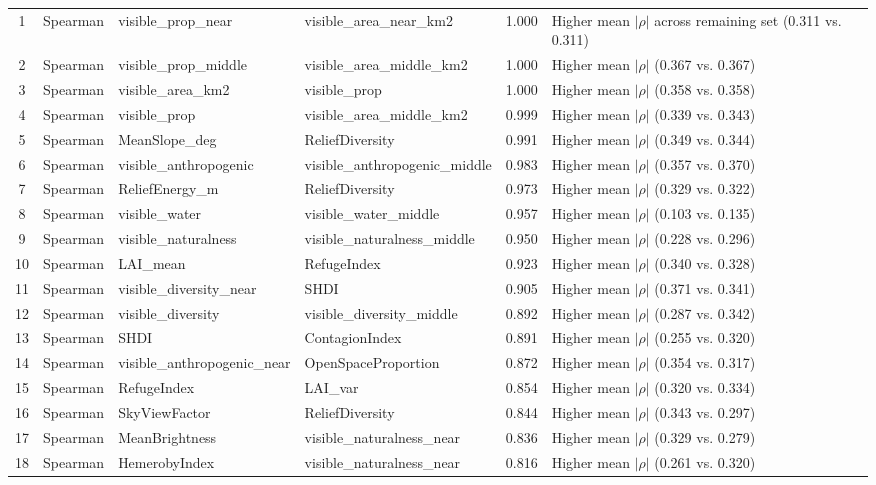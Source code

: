 \documentclass[hidelinks, 11pt]{article}
\begin{document}
\begin{longtable}{@{}cp{2.2cm}p{2.6cm}p{2.6cm}cp{6.5cm}@{}}
1  & Spearman & visible\_prop\_near & visible\_area\_near\_km2 & 1.000 & Higher mean $|\rho|$ across remaining set (0.311 vs. 0.311) \\
2  & Spearman & visible\_prop\_middle & visible\_area\_middle\_km2 & 1.000 & Higher mean $|\rho|$ (0.367 vs. 0.367) \\
3  & Spearman & visible\_area\_km2 & visible\_prop & 1.000 & Higher mean $|\rho|$ (0.358 vs. 0.358) \\
4  & Spearman & visible\_prop & visible\_area\_middle\_km2 & 0.999 & Higher mean $|\rho|$ (0.339 vs. 0.343) \\
5  & Spearman & MeanSlope\_deg & ReliefDiversity & 0.991 & Higher mean $|\rho|$ (0.349 vs. 0.344) \\
6  & Spearman & visible\_anthropogenic & visible\_anthropogenic\_middle & 0.983 & Higher mean $|\rho|$ (0.357 vs. 0.370) \\
7  & Spearman & ReliefEnergy\_m & ReliefDiversity & 0.973 & Higher mean $|\rho|$ (0.329 vs. 0.322) \\
8  & Spearman & visible\_water & visible\_water\_middle & 0.957 & Higher mean $|\rho|$ (0.103 vs. 0.135) \\
9  & Spearman & visible\_naturalness & visible\_naturalness\_middle & 0.950 & Higher mean $|\rho|$ (0.228 vs. 0.296) \\
10 & Spearman & LAI\_mean & RefugeIndex & 0.923 & Higher mean $|\rho|$ (0.340 vs. 0.328) \\
11 & Spearman & visible\_diversity\_near & SHDI & 0.905 & Higher mean $|\rho|$ (0.371 vs. 0.341) \\
12 & Spearman & visible\_diversity & visible\_diversity\_middle & 0.892 & Higher mean $|\rho|$ (0.287 vs. 0.342) \\
13 & Spearman & SHDI & ContagionIndex & 0.891 & Higher mean $|\rho|$ (0.255 vs. 0.320) \\
14 & Spearman & visible\_anthropogenic\_near & OpenSpaceProportion & 0.872 & Higher mean $|\rho|$ (0.354 vs. 0.317) \\
15 & Spearman & RefugeIndex & LAI\_var & 0.854 & Higher mean $|\rho|$ (0.320 vs. 0.334) \\
16 & Spearman & SkyViewFactor & ReliefDiversity & 0.844 & Higher mean $|\rho|$ (0.343 vs. 0.297) \\
17 & Spearman & MeanBrightness & visible\_naturalness\_near & 0.836 & Higher mean $|\rho|$ (0.329 vs. 0.279) \\
18 & Spearman & HemerobyIndex & visible\_naturalness\_near & 0.816 & Higher mean $|\rho|$ (0.261 vs. 0.320) \\

\end{longtable}
\end{document}
